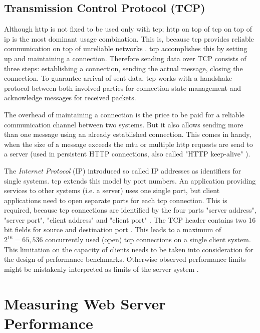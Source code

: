 \subsection{Transmission Control Protocol (TCP)}

Although \gls{http} is not fixed to be used only with \gls{tcp}; \gls{http} on top of \gls{tcp} on top of \gls{ip} is the most dominant usage combination. This is, because \gls{tcp} provides reliable communication on top of unreliable networks \cite{tcp}. \gls{tcp} accomplishes this by setting up and maintaining a connection. Therefore sending data over TCP consists of three steps: establishing a connection, sending the actual message, closing the connection. To guarantee arrival of sent data, \gls{tcp} works with a handshake protocol between both involved parties for connection state management and acknowledge messages for received packets. 

The overhead of maintaining a connection is the price to be paid for a reliable communication channel between two systems. But it also allows sending more than one message using an already established connection. This comes in handy, when the size of a message exceeds the \gls{mtu} or multiple \gls{http} requests are send to a server (used in persistent HTTP connections, also called "HTTP keep-alive" \cite{http}).

The \textit{Internet Protocol} (IP) introduced so called IP addresses as identifiers for single systems. \gls{tcp} extends this model by port numbers. An application providing services to other systems (i.e. a server) uses one single port, but client applications need to open separate ports for each \gls{tcp} connection. This is required, because \gls{tcp} connections are identified by the four parts "server address", "server port", "client address" and "client port" \cite{tcp}. The TCP header contains two 16 bit fields for source and destination port \cite{kn1}. This leads to a maximum of $2^{16} = 65,536$ concurrently used (open) \gls{tcp} connections on a single client system. This limitation on the capacity of clients needs to be taken into consideration for the design of performance benchmarks. Otherwise observed performance limits might be mistakenly interpreted as limits of the server system \cite{httperf}.
\\

\clearpage
\section{Measuring Web Server Performance}

